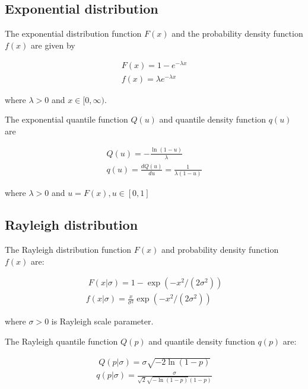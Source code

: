 \documentclass[ba]{imsart}
\numberwithin{equation}{section}
\theoremstyle{plain}
\begin{document}
\hypertarget{exponential-distribution}{%
\subsection*{Exponential distribution}\label{exponential-distribution}}

The exponential distribution function \(F(x)\) and the probability density function \(f(x)\) are given by

\[
\begin{gathered}
F(x)=1-e^{-\lambda x} \\ 
f(x)=\lambda e^{-\lambda x}
\end{gathered}
\]

where \(\lambda>0\) and \(x\in[0,\infty)\).

The exponential quantile function \(Q(u)\) and quantile density function \(q(u)\) are

\[
\begin{gathered}
Q(u)=-\frac{\ln(1-u)}{\lambda}\\ 
q(u)=\frac{dQ(u)}{du}=\frac{1}{\lambda(1-u)}
\end{gathered}
\]

where \(\lambda>0\) and \(u=F(x), u \in [0,1]\)

\hypertarget{rayleigh-distribution}{%
\subsection*{Rayleigh distribution}\label{rayleigh-distribution}}

The Rayleigh distribution function \(F(x)\) and probability density function \(f(x)\) are:

\[ 
\begin{gathered}\;
F(x|\sigma) = 1-\exp(-x^2/(2\sigma^2)) \\ 
f(x|\sigma) = \frac{x}{\sigma^2}\exp(-x^2/(2\sigma^2))
\end{gathered}
\]

where \(\sigma>0\) is Rayleigh scale parameter.

The Rayleigh quantile function \(Q(p)\) and quantile density function \(q(p)\) are:

\[
\begin{gathered}\;
Q(p|\sigma)=\sigma\sqrt{-2\ln(1-p)} \\ 
q(p|\sigma)=\frac{\sigma}{\sqrt{2}\sqrt{-\ln(1-p)}(1-p)}
\end{gathered}
\]
\end{document}
